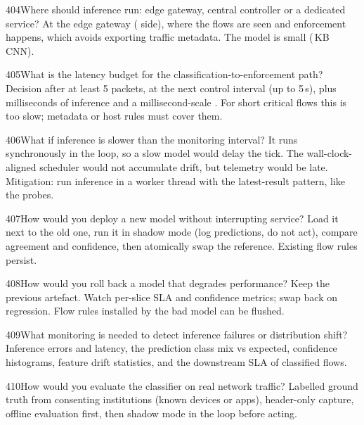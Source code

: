 \begin{qa}{404}{Where should inference run: edge gateway, central controller or a dedicated service?}
At the edge gateway ( side), where the flows are seen and enforcement happens, which avoids exporting
traffic metadata. The model is small (\NCnnSizeKb\,KB CNN).
\end{qa}

\begin{qa}{405}{What is the latency budget for the classification-to-enforcement path?}
Decision after at least 5 packets, at the next control interval (up to 5\,s), plus milliseconds of inference and a
millisecond-scale . For short critical flows this is too slow; metadata or host rules must cover
them.
\end{qa}

\begin{qa}{406}{What if inference is slower than the monitoring interval?}
It runs synchronously in the loop, so a slow model would delay the tick. The wall-clock-aligned scheduler would not
accumulate drift, but telemetry would be late. Mitigation: run inference in a worker thread with the latest-result
pattern, like the probes.
\end{qa}

\begin{qa}{407}{How would you deploy a new model without interrupting service?}
Load it next to the old one, run it in shadow mode (log predictions, do not act), compare agreement and confidence,
then atomically swap the reference. Existing flow rules persist.
\end{qa}

\begin{qa}{408}{How would you roll back a model that degrades performance?}
Keep the previous artefact. Watch per-slice SLA and confidence metrics; swap back on regression. Flow rules installed
by the bad model can be flushed.
\end{qa}

\begin{qa}{409}{What monitoring is needed to detect inference failures or distribution shift?}
Inference errors and latency, the prediction class mix vs expected, confidence histograms, feature drift statistics,
and the downstream SLA of classified flows.
\end{qa}

\begin{qa}{410}{How would you evaluate the classifier on real network traffic?}
Labelled ground truth from consenting institutions (known devices or apps), header-only capture, offline evaluation
first, then shadow mode in the loop before acting.
\end{qa}

\FigTransfer

